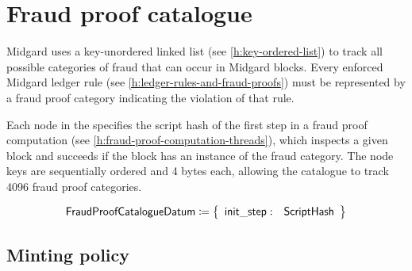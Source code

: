 \documentclass[../midgard.tex]{subfiles}
\begin{document}
\section{Fraud proof catalogue}
\label{h:fraud-proof-catalogue}

Midgard uses a key-unordered linked list (see \cref{h:key-ordered-list}) to track all possible categories of fraud that can occur in Midgard blocks. Every enforced Midgard ledger rule (see \cref{h:ledger-rules-and-fraud-proofs}) must be represented by a fraud proof category indicating the violation of that rule.

Each node in the  specifies the script hash of the first step in a fraud proof computation (see \cref{h:fraud-proof-computation-threads}), which inspects a given block and succeeds if the block has an instance of the fraud category. The node keys are sequentially ordered and 4 bytes each, allowing the catalogue to track 4096 fraud proof categories.

\begin{align*}
    \mathsf{FraudProofCatalogueDatum} &\coloneq \left\{
    \begin{array}{ll}
        \mathsf{init\_step}  : & \mathsf{ScriptHash}
    \end{array} \right\} \\
\end{align*}

\subsection{Minting policy}
\label{h:fraud-proof-catalogue-minting-policy}
\end{document}
